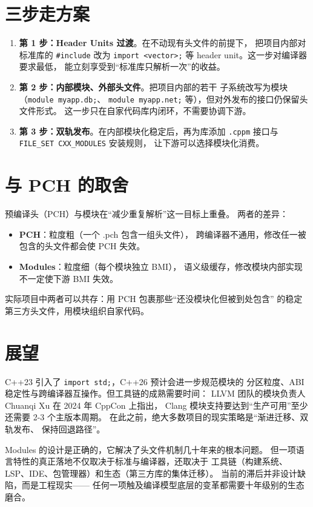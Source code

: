 \documentclass[12pt,a4paper,fontset=fandol]{ctexbook}
\newcommand{\flag}[1]{\texttt{#1}}
\begin{document}
\section{三步走方案}

\begin{bestpractice}[title=推荐的渐进路径]
\begin{enumerate}
  \item \textbf{第 1 步：Header Units 过渡}。在不动现有头文件的前提下，
        把项目内部对标准库的 \flag{\#include} 改为
        \flag{import <vector>;} 等 header unit。这一步对编译器要求最低，
        能立刻享受到“标准库只解析一次”的收益。
  \item \textbf{第 2 步：内部模块、外部头文件}。把项目内部的若干
        子系统改写为模块（\flag{module myapp.db;}、
        \flag{module myapp.net;} 等），但对外发布的接口仍保留头文件形式。
        这一步只在自家代码库内闭环，不需要协调下游。
  \item \textbf{第 3 步：双轨发布}。在内部模块化稳定后，再为库添加
        \flag{.cppm} 接口与 \flag{FILE\_SET CXX\_MODULES} 安装规则，
        让下游可以选择模块化消费。
\end{enumerate}
\end{bestpractice}

\section{与 PCH 的取舍}

预编译头（PCH）与模块在“减少重复解析”这一目标上重叠。
两者的差异：

\begin{compare}[title=PCH vs Modules]
\begin{itemize}
  \item \textbf{PCH}：粒度粗（一个 .pch 包含一组头文件），
        跨编译器不通用，修改任一被包含的头文件都会使 PCH 失效。
  \item \textbf{Modules}：粒度细（每个模块独立 BMI），
        语义级缓存，修改模块内部实现不一定使下游 BMI 失效。
\end{itemize}
\end{compare}

实际项目中两者可以共存：用 PCH 包裹那些“还没模块化但被到处包含”
的稳定第三方头文件，用模块组织自家代码。

\section{展望}

C++23 引入了 \flag{import std;}，C++26 预计会进一步规范模块的
分区粒度、ABI 稳定性与跨编译器互操作。但工具链的成熟需要时间：
LLVM 团队的模块负责人 Chuanqi Xu 在 2024 年 CppCon 上指出，
Clang 模块支持要达到“生产可用”至少还需要 2-3 个主版本周期。
在此之前，绝大多数项目的现实策略是“渐进迁移、双轨发布、
保持回退路径”。

\begin{note}[title=结语]
Modules 的设计是正确的，它解决了头文件机制几十年来的根本问题。
但一项语言特性的真正落地不仅取决于标准与编译器，还取决于
工具链（构建系统、LSP、IDE、包管理器）和生态（第三方库的集体迁移）。
当前的滞后并非设计缺陷，而是工程现实——
任何一项触及编译模型底层的变革都需要十年级别的生态磨合。
\end{note}
\end{document}

